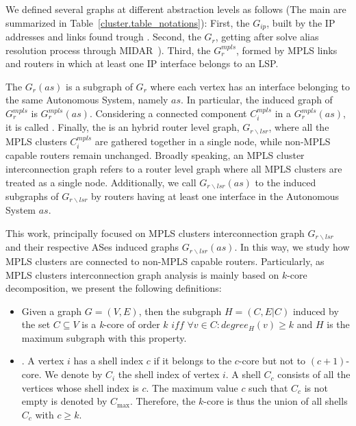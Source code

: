 We defined several graphs at different abstraction levels as follows (The main
are summarized in Table~\ref{cluster.table_notations}): First, the  $G_{ip}$, built by the IP addresses and links found trough \traceroute.
Second, the  $G_{r}$, getting after solve alias
resolution process through MIDAR~\cite{Keys13}). Third, the  $G^{mpls}_{r}$, formed by MPLS links and routers in which at least
one IP interface belongs to an LSP.

The  $G_{r}(as)$ is a subgraph of $G_{r}$ where each
vertex  has an interface belonging to the same Autonomous System, namely $as$.
In particular, the induced graph of $G_r^{mpls}$ is $G^{mpls}_{r}(as)$.
Considering a connected component $C^{mpls}_{i}$ in a $G^{mpls}_{r}(as)$, it is
called  . Finally, the  is an hybrid router level graph,  $G_{r\backslash lsr}$, where all the
MPLS clusters $C^{mpls}_{i}$ are gathered together in a single node, while
non-MPLS capable routers remain unchanged. Broadly speaking, an MPLS cluster
interconnection graph refers to a router level graph where all MPLS clusters are
treated as a single node. Additionally, we call $G_{r\backslash lsr}(as)$ to the
induced subgraphs of $G_{r\backslash lsr}$ by routers having at least one
interface in the Autonomous System $as$.

This work,  principally focused on MPLS clusters interconnection graph
$G_{r\backslash lsr}$ and their respective ASes induced graphs $G_{r\backslash
lsr}(as)$. In this way, we study how MPLS clusters are connected to non-MPLS
capable routers. Particularly, as MPLS clusters interconnection graph analysis
is mainly based on $k$-core decomposition, we  present the following
definitions:
\begin{itemize}
  \item{} Given a graph $G=(V,E)$, then the
  subgraph $H=(C,E|C)$ induced by the set $ C\subseteq V$ is a \textit{k}-core
  of order $k$ $iff$ $\forall v \in C: degree_{H}(v)\geq k$ and $H$ is the
  maximum subgraph with this property.
      
  \item{}. A vertex $i$ has a shell index $c$ if it
  belongs to the $c$-core but not to $(c+1)$-core. We denote by $C_i$ the shell
  index of vertex $i$. A shell $C_c$ consists of all the vertices whose shell
  index is $c$. The maximum value $c$ such that $C_c$ is not empty is denoted by
  $C_{\max}$.  Therefore, the $k$-core is thus the union of all shells $C_c$ with
  $c \geq k$.
\end{itemize}

